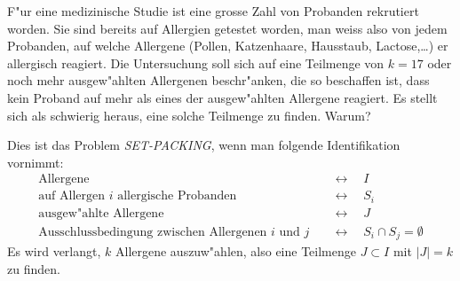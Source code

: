 F"ur eine medizinische Studie ist eine grosse Zahl von Probanden rekrutiert
worden.
Sie sind bereits auf Allergien getestet worden, man weiss also von jedem
Probanden, auf welche Allergene (Pollen, Katzenhaare, Hausstaub, Lactose,\dots)
er allergisch reagiert.
Die Untersuchung soll sich auf eine Teilmenge von $k=17$ oder noch
mehr ausgew"ahlten
Allergenen beschr"anken, die so beschaffen ist, dass kein Proband auf mehr als 
eines der ausgew"ahlten Allergene reagiert.
Es stellt sich als schwierig heraus, eine solche Teilmenge zu finden.
Warum?

\begin{loesung}
Dies ist das Problem {\em SET-PACKING}, wenn man folgende Identifikation
vornimmt:
\begin{align*}
\text{Allergene}                            &\quad\leftrightarrow\quad I\\
\text{auf Allergen $i$ allergische Probanden}&\quad\leftrightarrow\quad S_i\\
\text{ausgew"ahlte Allergene}               &\quad\leftrightarrow\quad J\\
\text{Ausschlussbedingung zwischen Allergenen $i$ und $j$}&\quad\leftrightarrow\quad S_i\cap S_j = \emptyset
\end{align*}
Es wird verlangt, $k$ Allergene auszuw"ahlen, also eine Teilmenge
$J\subset I$ mit $|J|=k$ zu finden.
\end{loesung}

